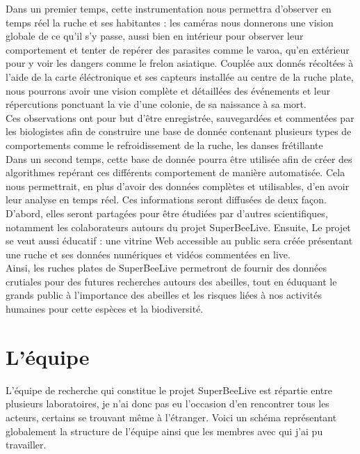 \documentclass[11pt,french,a4paper]{report}
\begin{document}
Dans un premier temps, cette instrumentation nous permettra d'observer en temps réel la ruche et ses habitantes : 
les caméras nous donnerons une vision globale de ce qu'il s'y passe, aussi bien en intérieur pour observer leur 
comportement et tenter de repérer des parasites comme le varoa, qu'en extérieur pour y voir les dangers comme le frelon asiatique. %
Couplée aux donnés récoltées à l'aide de la carte éléctronique et ses capteurs installée au centre de la ruche plate, 
nous pourrons avoir une vision complète et détaillées des événements et leur répercutions ponctuant la vie d'une colonie,
de sa naissance à sa mort. \\
Ces observations ont pour but d'être enregistrée, sauvegardées et commentées par les biologistes afin de construire une base
de donnée contenant plusieurs types de comportements comme le refroidissement de la ruche, les danses frétillante %
\\
Dans un second temps, cette base de donnée pourra être utilisée afin de créer des algorithmes repérant ces différents comportement
de manière automatisée. Cela nous permettrait, en plus d'avoir des données complètes et utilisables, d'en avoir leur analyse en 
temps réel. Ces informations seront diffusées de deux façon. D'abord, elles seront partagées pour être étudiées par d'autres scientifiques, 
notamment les colaborateurs autours du projet SuperBeeLive. Ensuite, Le projet se veut aussi éducatif : une vitrine Web accessible au public 
sera créée présentant une ruche et ses données numériques et vidéos commentées en live. \\

Ainsi, les ruches plates de SuperBeeLive permetront de fournir des données crutiales pour des futures recherches autours des abeilles, tout en 
éduquant le grands public à l'importance des abeilles et les risques liées à nos activités humaines pour cette espèces et la biodiversité. 

\section{L'équipe}
L'équipe de recherche qui constitue le projet SuperBeeLive est répartie entre plusieurs laboratoires, je n'ai donc pas eu l'occasion
d'en rencontrer tous les acteurs, certains se trouvant même à l'étranger. Voici un schéma représentant globalement la structure
de l'équipe ainsi que les membres avec qui j'ai pu travailler. \\
\end{document}
